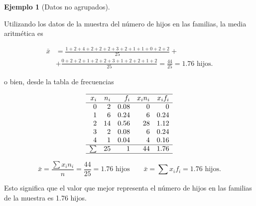 \documentclass[
  a4paper,
]{scrreport}
\theoremstyle{plain}
\theoremstyle{definition}
\theoremstyle{definition}
\newtheorem{example}{Ejemplo}[chapter]
\theoremstyle{remark}
\begin{document}
\begin{example}[Datos no
agrupados]\protect\hypertarget{exm-media-datos-no-agrupados}{}\label{exm-media-datos-no-agrupados}

Utilizando los datos de la muestra del número de hijos en las familias,
la media aritmética es

\begin{align*}
\bar{x} &= \frac{1+2+4+2+2+2+3+2+1+1+0+2+2}{25}+\\
 &+\frac{0+2+2+1+2+2+3+1+2+2+1+2}{25} = \frac{44}{25} = 1.76 \mbox{ hijos}.
\end{align*}

o bien, desde la tabla de frecuencias

\[
\begin{array}{rrrrr}
\hline
x_i & n_i & f_i & x_in_i & x_if_i\\
\hline
0 & 2 & 0.08 & 0 & 0\\
1 & 6 & 0.24 & 6 & 0.24\\
2 & 14 & 0.56 & 28 & 1.12\\
3 & 2  & 0.08 & 6 & 0.24\\
4 & 1 & 0.04 & 4 & 0.16 \\
\hline
\sum & 25 & 1 & 44 & 1.76 \\
\hline
\end{array}
\]

\[
\bar{x} = \frac{\sum x_in_i}{n} = \frac{44}{25}= 1.76 \mbox{ hijos}\qquad \bar{x}=\sum{x_if_i} = 1.76 \mbox{ hijos}.
\]

Esto significa que el valor que mejor representa el número de hijos en
las familias de la muestra es 1.76 hijos.

\end{example}
\end{document}
